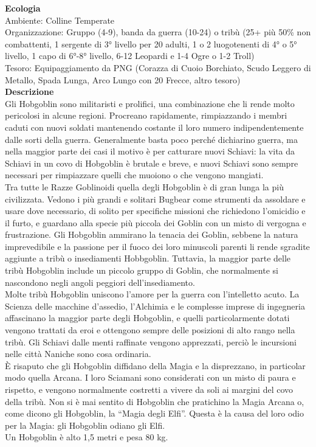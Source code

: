 \begin{multicols}{2}
\textbf{Ecologia}\\
Ambiente: Colline Temperate\\
Organizzazione: Gruppo (4-9), banda da guerra (10-24) o tribù (25+ più 50\% non combattenti, 1 sergente di 3° livello per 20 adulti, 1 o 2 luogotenenti di 4° o 5° livello, 1 capo di 6°-8° livello, 6-12 Leopardi e 1-4 Ogre o 1-2 Troll)\\
Tesoro: Equipaggiamento da PNG (Corazza di Cuoio Borchiato, Scudo Leggero di Metallo, Spada Lunga, Arco Lungo con 20 Frecce, altro tesoro)\\
\textbf{Descrizione}\\
Gli Hobgoblin sono militaristi e prolifici, una combinazione che li rende molto pericolosi in alcune regioni. Procreano rapidamente, rimpiazzando i membri caduti con nuovi soldati mantenendo costante il loro numero indipendentemente dalle sorti della guerra. Generalmente basta poco perché dichiarino guerra, ma nella maggior parte dei casi il motivo è per catturare nuovi Schiavi: la vita da Schiavi in un covo di Hobgoblin è brutale e breve, e nuovi Schiavi sono sempre necessari per rimpiazzare quelli che muoiono o che vengono mangiati.\\
Tra tutte le Razze Goblinoidi quella degli Hobgoblin è di gran lunga la più civilizzata.
Vedono i più grandi e solitari Bugbear come strumenti da assoldare e usare dove necessario, di solito per specifiche missioni che richiedono l’omicidio e il furto, e guardano alla specie più piccola dei Goblin con un misto di vergogna e frustrazione. Gli Hobgoblin ammirano la tenacia dei Goblin, sebbene la natura imprevedibile e la passione per il fuoco dei loro minuscoli parenti li rende sgradite aggiunte a tribù o insediamenti Hobbgoblin. Tuttavia, la maggior parte delle tribù Hobgoblin include un piccolo gruppo di Goblin, che normalmente si nascondono negli angoli peggiori dell’insediamento.\\
Molte tribù Hobgoblin uniscono l’amore per la guerra con l’intelletto acuto. La Scienza delle macchine d'assedio, l’Alchimia e le complesse imprese di ingegneria affascinano la maggior parte degli Hobgoblin, e quelli particolarmente dotati vengono trattati da eroi e ottengono sempre delle posizioni di alto rango nella tribù. Gli Schiavi dalle menti raffinate vengono apprezzati, perciò le incursioni nelle città Naniche sono cosa ordinaria.\\
È risaputo che gli Hobgoblin diffidano della Magia e la disprezzano, in particolar modo quella Arcana. I loro Sciamani sono considerati con un misto di paura e rispetto, e vengono normalmente costretti a vivere da soli ai margini del covo della tribù. Non si è mai sentito di Hobgoblin che pratichino la Magia Arcana o, come dicono gli Hobgoblin, la “Magia degli Elfi”. Questa è la causa del loro odio per la Magia: gli Hobgoblin odiano gli Elfi.\\
Un Hobgoblin è alto 1,5 metri e pesa 80 kg.\\



\end{multicols}
